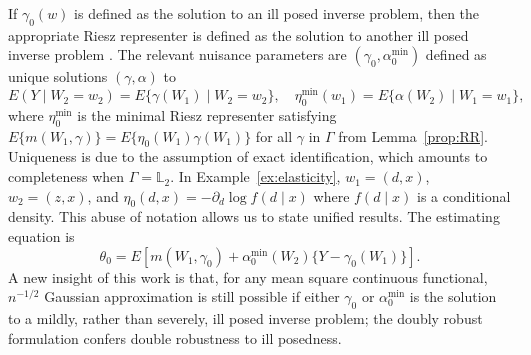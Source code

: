 If $\gamma_0(w)$ is defined as the solution to an ill posed inverse problem, then the appropriate Riesz representer is defined as the solution to another ill posed inverse problem \cite{severini2012efficiency,ichimura2021influence}. The relevant nuisance parameters are $(\gamma_0,\alpha^{\min}_0)$ defined as unique solutions $(\gamma,\alpha)$ to
$$
E(Y \mid W_2=w_2)=E\{\gamma(W_1) \mid W_2=w_2\},\quad \eta_0^{\min}(w_1)=E\{\alpha(W_2) \mid W_1=w_1\},
$$
where $\eta_0^{\min}$ is the minimal Riesz representer satisfying $E\{m(W_1,\gamma)\}=E\{\eta_0(W_1)\gamma(W_1)\}$ for all $\gamma$ in $\Gamma$ from Lemma~\ref{prop:RR}. Uniqueness is due to the assumption of exact identification, which amounts to completeness when $\Gamma=\mathbb{L}_2$. In Example~\ref{ex:elasticity}, $w_1=(d,x)$, $w_2=(z,x)$, and $\eta_0(d,x)=-\partial_d  
\log f(d\mid x)$ where $f(d \mid x)$ is a conditional density. This abuse of notation allows us to state unified results. The estimating equation is 
$$
\theta_0=E[m(W_1,\gamma_0)+\alpha^{\min}_0(W_2)\{Y-\gamma_0(W_1)\}].
$$ 
A new insight of this work is that, for any mean square continuous functional, $n^{-1/2}$ Gaussian approximation is still possible if either $\gamma_0$ or $\alpha^{\min}_0$ is the solution to a mildly, rather than severely, ill posed inverse problem; the doubly robust formulation confers double robustness to ill posedness.